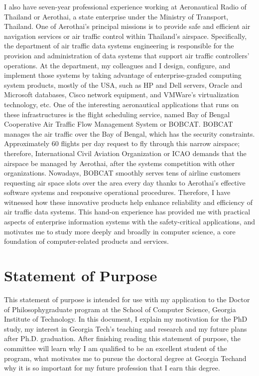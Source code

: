 \documentclass[a4paper,10pt]{report}
\newcommand{\university}{Georgia Institute of Technology}
\newcommand{\department}{School of Computer Science}
\newcommand{\uniabbre}{Georgia Tech}
\newcommand{\degree}{Doctor of Philosophy}
\begin{document}
\vspace{0.2cm}
I also have seven-year professional experience working at Aeronautical Radio of Thailand or Aerothai, a state enterprise under the Ministry of Transport, Thailand. One of Aerothai's principal missions is to provide safe and efficient air navigation services or air traffic control within Thailand's airspace. Specifically, the department of air traffic data systems engineering is responsible for the provision and administration of data systems that support air traffic controllers' operations. At the department, my colleagues and I design, configure, and implement those systems by taking advantage of enterprise-graded computing system products, mostly of the USA, such as HP and Dell servers, Oracle and Microsoft databases, Cisco network equipment, and VMWare's virtualization technology, etc. One of the interesting aeronautical applications that runs on these infrastructures is the flight scheduling service, named Bay of Bengal Cooperative Air Traffic Flow Management System or BOBCAT. BOBCAT manages the air traffic over the Bay of Bengal, which has the security constraints. Approximately 60 flights per day request to fly through this narrow airspace; therefore, International Civil Aviation Organization or ICAO demands that the airspace be managed by Aerothai, after the systems competition with other organizations. Nowadays, BOBCAT smoothly serves tens of airline customers requesting air space slots over the area every day thanks to Aerothai's effective software systems and responsive operational procedures.  Therefore, I have witnessed how these innovative products help enhance reliability and efficiency of air traffic data systems. This hand-on experience has provided me with practical aspects of enterprise information systems with the safety-critical applications, and motivates me to study more deeply and broadly in computer science, a core foundation of computer-related products and services. 

\section{Statement of Purpose }
This statement of purpose is intended for use with my application to the \degree \space graduate program at the \department, \university. In this document, I explain my motivation for the PhD study, my interest in \uniabbre's teaching and research and my future plans after Ph.D. graduation. After finishing reading this statement of purpose, the committee will learn why I am qualified to be an excellent student of the program, what motivates me to pursue the doctoral degree at \uniabbre \space and why it is so important for my future profession that I earn this degree.
\end{document}
